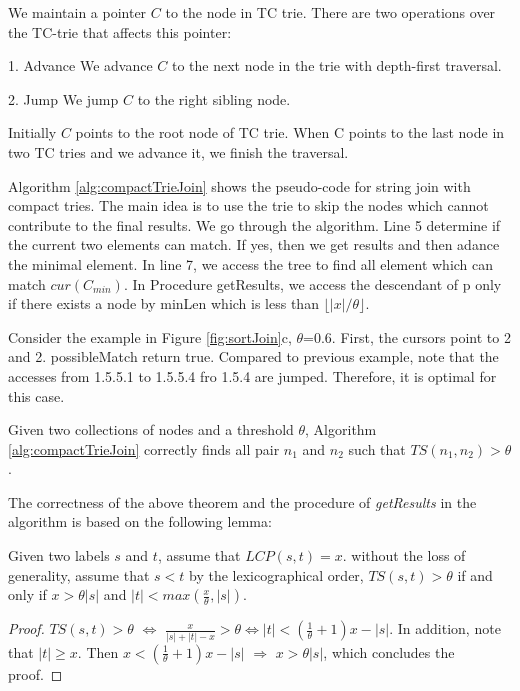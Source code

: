 We maintain a pointer $C$ to the node in TC trie. There are two operations over the TC-trie that affects this pointer:

1. \textsf{Advance} We advance $C$ to the next node in the trie with depth-first traversal.

2. \textsf{Jump} We jump $C$ to the right sibling node.

Initially $C$ points to the root node of TC trie. When C points to the last node in two TC tries and we advance it, we finish the traversal.

Algorithm \ref{alg:compactTrieJoin} shows the pseudo-code for string join with compact tries. The main idea is to use the trie to skip the nodes which cannot contribute to the final results. We  go through the algorithm. Line 5 determine if the current two elements can match. If yes, then we get results and then adance the minimal element. In line 7, we access the tree to find all element which can match $cur(C_{min})$. In Procedure getResults, we access the descendant of p only if there exists a node by minLen which is less than $ \lfloor |x|/ \theta \rfloor $.


\smallskip
\smallskip

\begin{example}
Consider the example in Figure \ref{fig:sortJoin}c, $\theta$=0.6. First, the cursors point to 2 and 2. possibleMatch return true. Compared to previous example, note that the accesses from 1.5.5.1 to 1.5.5.4 fro 1.5.4 are jumped. Therefore, it is optimal for this case.
\end{example}

\smallskip
\smallskip


\begin{theorem} Given two collections of nodes and a threshold $\theta$, Algorithm \ref{alg:compactTrieJoin} correctly finds all pair $n_1$ and $n_2$ such that $TS(n_1,n_2) > \theta$.
\end{theorem}

The correctness of the above theorem and the procedure of \textit{getResults} in the algorithm is based on the following lemma:

\begin{lem} Given two labels $s$ and $t$,  assume that $LCP(s,t) = x$. without the loss of generality, assume that $s<t$ by the lexicographical order, $TS(s,t) > \theta$ if and only if  $ x > \theta |s| $ and $  |t| < max(\frac{x}{\theta},|s|)$.
\end{lem}
\begin{proof}  $TS(s,t) > \theta$ $\Leftrightarrow$ $\frac{x}{|s|+|t|-x} > \theta \Leftrightarrow |t| < (\frac{1}{\theta}+1)x-|s|$. In addition, note that $|t| \geq x$. Then $x < (\frac{1}{\theta}+1)x-|s|$ $\Rightarrow$ $x > \theta |s| $, which concludes the proof.
\end{proof}


